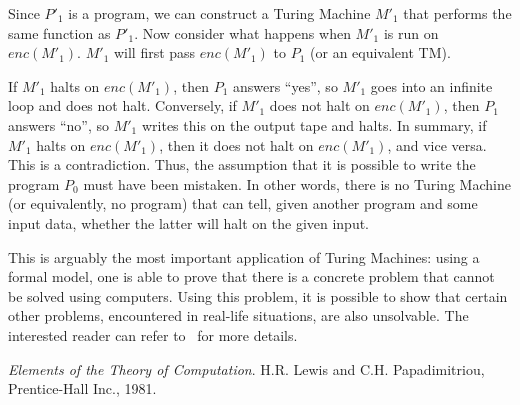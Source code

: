 \documentclass[12pt]{article}
\begin{document}
Since $P'_1$  is a program, we  can construct a Turing  Machine $M'_1$ that
performs the same function as $P'_1$. Now consider what happens when $M'_1$
is run on  $enc(M'_1)$. $M'_1$ will first pass $enc(M'_1)$  to $P_1$ (or an
equivalent TM).

If $M'_1$ halts on $enc(M'_1)$,  then $P_1$ answers ``yes'', so $M'_1$ goes
into an  infinite loop and does  not halt.  Conversely, if  $M'_1$ does not
halt on  $enc(M'_1)$, then $P_1$ answers  ``no'', so $M'_1$  writes this on
the output tape and halts. In summary, if $M'_1$ halts on $enc(M'_1)$, then
it   does  not  halt   on  $enc(M'_1)$,   and  vice   versa.   This   is  a
contradiction.  Thus, the  assumption  that  it is  possible  to write  the
program $P_0$ must  have been mistaken. In other words,  there is no Turing
Machine (or equivalently, no program)  that can tell, given another program
and some input data, whether the latter will halt on the given input.

This is arguably the most important application of Turing Machines: using a
formal model,  one is able to prove  that there is a  concrete problem that
cannot be  solved using  computers. Using this  problem, it is  possible to
show that certain other  problems, encountered in real-life situations, are
also unsolvable.   The interested reader  can refer to~\cite{foo}  for more
details. 
\begin{thebibliography}{}
\emph{Elements of the Theory of Computation}. H.R. Lewis and
C.H. Papadimitriou, Prentice-Hall Inc., 1981.
\end{thebibliography}
\end{document}
